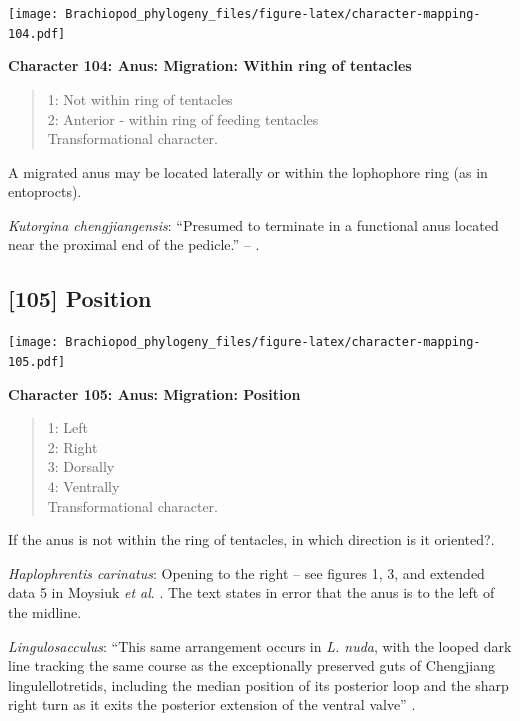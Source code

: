 \documentclass[]{book}
\theoremstyle{definition}
\theoremstyle{definition}
\theoremstyle{definition}
\theoremstyle{remark}
\begin{document}
\texttt{[image: Brachiopod\_phylogeny\_files/figure-latex/character-mapping-104.pdf]}

\textbf{Character 104: Anus: Migration: Within ring of tentacles}

\begin{quote}
1: Not within ring of tentacles\\
2: Anterior - within ring of feeding tentacles\\
Transformational character.
\end{quote}

A migrated anus may be located laterally or within the lophophore ring
(as in entoprocts).

\emph{Kutorgina chengjiangensis}: ``Presumed to terminate in a
functional anus located near the proximal end of the pedicle.'' --
\citet{Zhang2007Rhynchonelliformeanbrachiopods}.

\hypertarget{position}{%
\subsection*{{[}105{]} Position}\label{position}}

\texttt{[image: Brachiopod\_phylogeny\_files/figure-latex/character-mapping-105.pdf]}

\textbf{Character 105: Anus: Migration: Position}

\begin{quote}
1: Left\\
2: Right\\
3: Dorsally\\
4: Ventrally\\
Transformational character.
\end{quote}

If the anus is not within the ring of tentacles, in which direction is
it oriented?.

\emph{Haplophrentis carinatus}: Opening to the right -- see figures 1,
3, and extended data 5 in Moysiuk \emph{et al}.
\citeyearpar{Moysiuk2017Hyolithsare}. The text states in error that the
anus is to the left of the midline.

\emph{Lingulosacculus}: ``This same arrangement occurs in \emph{L.
nuda}, with the looped dark line tracking the same course as the
exceptionally preserved guts of Chengjiang lingulellotretids, including
the median position of its posterior loop and the sharp right turn as it
exits the posterior extension of the ventral valve''
\citep[p.310]{Balthasar2009EarlyCambrian}.
\end{document}
